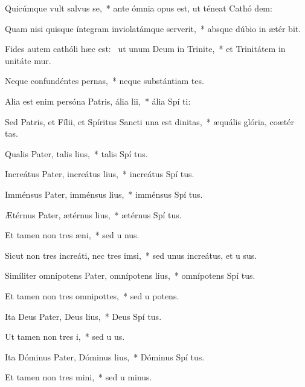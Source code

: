 \item Quicúmque vult salvus se,~* ante ómnia opus est, ut téneat Cathó dem:
\item Quam nisi quisque íntegram inviolatámque serverit,~* absque dúbio in ætér bit.
\item Fides autem cathóli hæc est:~\pscross{} ut unum Deum in Trinite,~* et Trinitátem in unitáte mur.
\item Neque confundéntes pernas,~* neque substántiam tes.
\item Alia est enim persóna Patris, ália lii,~* ália Spí ti:
\item Sed Patris, et Fílii, et Spíritus Sancti una est dinitas,~* æquális glória, coætér tas.
\item Qualis Pater, talis lius,~* talis Spí tus.
\item Increátus Pater, increátus lius,~* increátus Spí tus.
\item Imménsus Pater, imménsus lius,~* imménsus Spí tus.
\item Ætérnus Pater, ætérnus lius,~* ætérnus Spí tus.
\item Et tamen non tres æni,~* sed u nus.
\item Sicut non tres increáti, nec tres imsi,~* sed unus increátus, et u sus.
\item Simíliter omnípotens Pater, omnípotens lius,~* omnípotens Spí tus.
\item Et tamen non tres omnipottes,~* sed u potens.
\item Ita Deus Pater, Deus lius,~* Deus Spí tus.
\item Ut tamen non tres i,~* sed u  us.
\item Ita Dóminus Pater, Dóminus lius,~* Dóminus Spí tus.
\item Et tamen non tres mini,~* sed u  minus.
